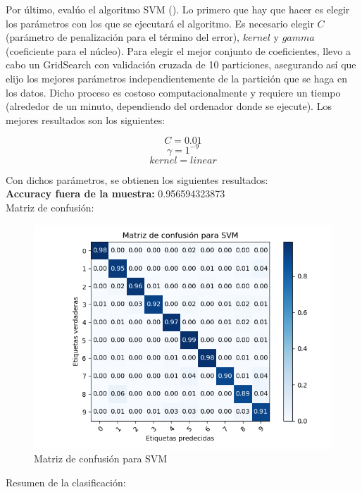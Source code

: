 \newpage

Por último, evalúo el algoritmo SVM (\cite{svc}). Lo primero que hay que hacer es elegir los parámetros con los que se ejecutará el algoritmo. Es necesario elegir $C$ (parámetro de penalización para el término del error), $kernel$ y $gamma$ (coeficiente para el núcleo). Para elegir el mejor conjunto de coeficientes, llevo a cabo un GridSearch con validación cruzada de 10 particiones, asegurando así que elijo los mejores parámetros independientemente de la partición que se haga en los datos. Dicho proceso es costoso computacionalmente y requiere un tiempo (alrededor de un minuto, dependiendo del ordenador donde se ejecute). Los mejores resultados son los siguientes:

$$ C = 0.01$$
$$ \gamma = 1^{-9} $$
$$ kernel = linear $$

Con dichos parámetros, se obtienen los siguientes resultados: \\

\textbf{Accuracy fuera de la muestra:} 0.956594323873 \\

Matriz de confusión:

\begin{figure}[H] %
	\centering
	\includegraphics[scale=0.8]{conf-m-svm.png}  %
	\caption{Matriz de confusión para SVM} 
	\label{fig:conf-m-svm}
\end{figure}

\newpage
Resumen de la clasificación:


